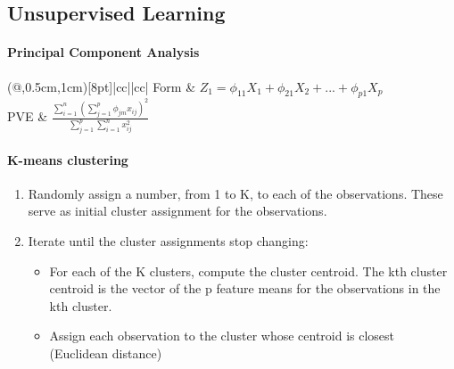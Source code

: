 \documentclass[../document.tex]{subfiles}
\begin{document}
	\subsection{Unsupervised Learning}

	\paragraph{Principal Component Analysis}
	\begin{center}
		\begin{TAB}(@,0.5cm,1cm)[8pt]{|cc|}{|cc|}%
			Form & $Z_{1}=\phi_{11}X_{1}+\phi_{21}X_{2}+...+\phi_{p1}X_{p}$ \\
			PVE & $\frac{\sum_{i=1}^{n}(\sum_{j=1}^{p}\phi_{jm}x_{ij})^2}{\sum_{j=1}^{p}\sum_{i=1}^{n}x_{ij}^2}$\\
		\end{TAB}
	\end{center}

	\paragraph{K-means clustering}
	\begin{center}
		\begin{enumerate}
			\item Randomly assign a number, from 1 to K, to each of the observations. These serve as initial cluster assignment for the observations.
			\item Iterate until the cluster assignments stop changing:
			\begin{itemize}
				\item For each of the K clusters, compute the cluster centroid. The kth cluster centroid is the vector of the p feature means for the observations in the kth cluster.
				\item Assign each observation to the cluster whose centroid is closest (Euclidean distance)
			\end{itemize}
		\end{enumerate}
	\end{center}
\end{document}
